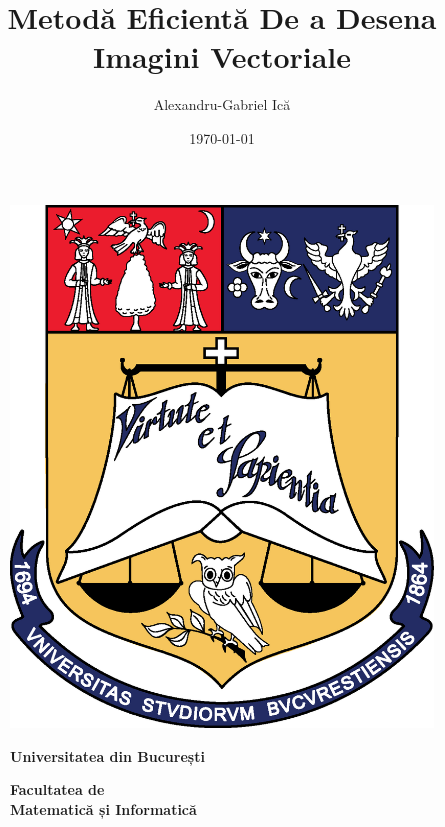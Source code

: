 \documentclass[a4paper, 12pt]{report}
\title{Metodă Eficientă De a Desena Imagini Vectoriale}
\author{Alexandru-Gabriel Ică}
\date{\today}
\begin{document}
\begin{titlepage}
    \begin{figure}[!htb]
        \centering
        \begin{minipage}{0.19\textwidth}
            \includegraphics[width=\linewidth]{img/UB_Logo.png}
        \end{minipage}
        \begin{minipage}{0.57\textwidth}
            \large
            \vspace{0.2cm}
            \begin{center}
                \textbf{Universitatea din București}
            \end{center}
            \vspace{0.3cm}
            \begin{center}
                \textbf{
                    Facultatea de \\
                    Matematică și Informatică
                }
            \end{center}
        \end{minipage}

\end{figure}
\end{titlepage}
\end{document}
